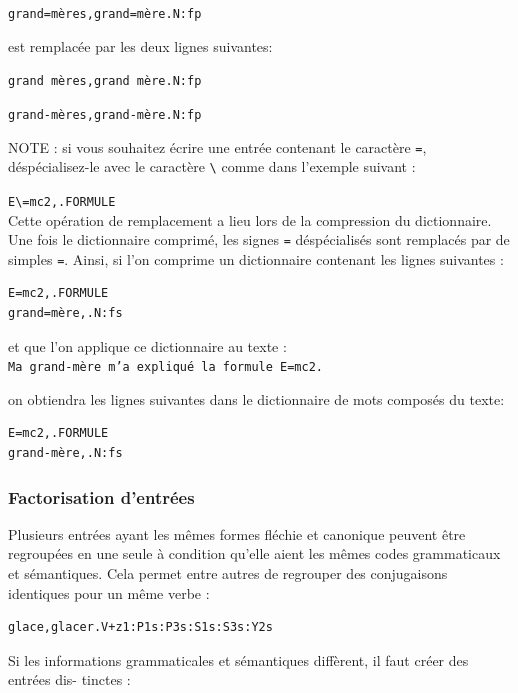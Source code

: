 \bigskip \verb$grand=mères,grand=mère.N:fp$

\bigskip
\noindent est remplacée par les deux lignes suivantes:

\bigskip
\verb$grand mères,grand mère.N:fp$

\verb$grand-mères,grand-mère.N:fp$


\bigskip
\noindent NOTE : si vous souhaitez écrire une entrée contenant le caractère \verb+=+,
déspécialisez-le avec le caractère \verb+\+ comme dans l’exemple suivant :


\bigskip
\verb$E\=mc2,.FORMULE$\\


Cette opération de remplacement a lieu lors de la compression du dictionnaire. Une fois
le dictionnaire comprimé, les signes \verb+=+ déspécialisés sont remplacés par de simples \verb+=+.
Ainsi, si l’on comprime un dictionnaire contenant les lignes suivantes :


\begin{verbatim}
E=mc2,.FORMULE
grand=mère,.N:fs
\end{verbatim}

\noindent et que l’on applique ce dictionnaire au texte :\\

\verb$Ma grand-mère m’a expliqué la formule E=mc2.$


\bigskip \noindent on obtiendra les lignes suivantes dans le dictionnaire de mots composés du texte:


\begin{verbatim}
E=mc2,.FORMULE
grand-mère,.N:fs
\end{verbatim}


\subsubsection{Factorisation d’entrées}

Plusieurs entrées ayant les mêmes formes fléchie et canonique peuvent être regroupées
en une seule à condition qu’elle aient les mêmes codes grammaticaux et sémantiques. Cela
permet entre autres de regrouper des conjugaisons identiques pour un même verbe :


\bigskip
\begin{verbatim}
glace,glacer.V+z1:P1s:P3s:S1s:S3s:Y2s
\end{verbatim}

\bigskip 
\noindent Si les informations grammaticales et sémantiques diffèrent, il faut créer des entrées dis-
tinctes :


